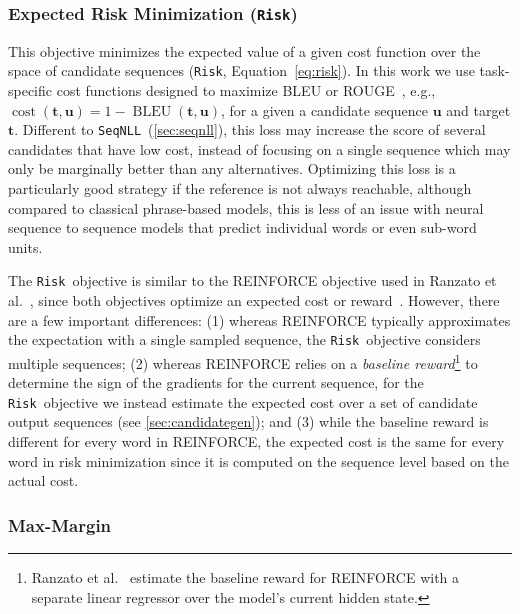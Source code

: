 \documentclass[11pt,a4paper]{article}
\newcommand{\goldreference}{\mathbf{t}}
\newcommand{\candhypo}{\mathbf{u}}
\newcommand{\SeqNLL}{\texttt{SeqNLL}}
\newcommand{\Risk}{\texttt{Risk}}
\begin{document}
\subsubsection*{Expected Risk Minimization (\Risk)}
\label{sec:risk}

This objective minimizes the expected value of a given cost function over the space of candidate sequences (\Risk, Equation~\ref{eq:risk}).
In this work we use task-specific cost functions designed to maximize BLEU or ROUGE~\citep{lin2004rouge}, e.g., $\operatorname{cost}(\goldreference, \candhypo) = 1 - \operatorname{BLEU}(\goldreference, \candhypo)$, for a given a candidate sequence $\candhypo$ and target $\goldreference$.
Different to \SeqNLL~(\textsection\ref{sec:seqnll}), this loss may increase the score of several candidates that have low cost, instead of focusing on a single sequence which may only be marginally better than any alternatives.
Optimizing this loss is a particularly good strategy if the reference is not always reachable,
although compared to classical phrase-based models, this is less of an issue with neural sequence to sequence models that predict individual words or even sub-word units.

The \Risk~objective is similar to the REINFORCE objective used in Ranzato et al.~, since both objectives optimize an expected cost or reward~\citep{williams1992reinforce}.
However, there are a few important differences:
(1) whereas REINFORCE typically approximates the expectation with a single sampled sequence, the \Risk~objective considers multiple sequences;
(2) whereas REINFORCE relies on a {\it baseline reward}\footnote{Ranzato et al.~ estimate the baseline reward for REINFORCE with a separate linear regressor over the model's current hidden state.} to determine the sign of the gradients for the current sequence, for the \Risk~objective we instead estimate the expected cost over a set of candidate output sequences (see \textsection\ref{sec:candidategen});
and (3) while the baseline reward is different for every word in REINFORCE, the expected cost is the same for every word in risk minimization since it is computed on the sequence level based on the actual cost.

\subsubsection*{Max-Margin}
\label{sec:maxmargin}
\end{document}
